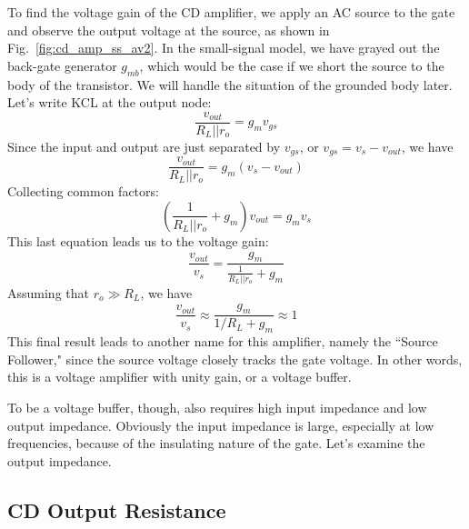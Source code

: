 To find the voltage gain of the CD amplifier, we apply an AC source to the gate and observe the output voltage at the source, as shown in Fig.~\ref{fig:cd_amp_ss_av2}.  In the small-signal model, we have grayed out the back-gate generator $g_{mb}$, which would be the case if we short the source to the body of the transistor.  We will handle the situation of the grounded body later. Let's write KCL at the output node:
% 
\begin{equation}
	\frac{{{v_{out}}}}{{{R_L}||{r_o}}} = {g_m}{v_{gs}}
\end{equation}
%
Since the input and output are just separated by $v_{gs}$, or $v_{gs} = v_{s} - v_{out}$, we have
%
\begin{equation}
	\frac{{{v_{out}}}}{{{R_L}||{r_o}}} = {g_m}\left( {{v_{s}} - {v_{out}}} \right)
\end{equation}
%
Collecting common factors:
%
\begin{equation}
	\left( {\frac{1}{{{R_L}||{r_o}}} + {g_m}} \right){v_{out}} = {g_m}{v_{s}}
\end{equation}
%
This last equation leads us to the voltage gain:
%
\begin{equation}
	\frac{{{v_{out}}}}{{{v_{s}}}} = \frac{{{g_m}}}{{\frac{1}{{{R_L}||{r_o}}} + {g_m}}}
\end{equation}
Assuming that $r_o \gg R_L$, we have
%
\begin{equation}
	\frac{{{v_{out}}}}{{{v_{s}}}} \approx \frac{{{g_m}}}{{1/{R_L} + {g_m}}} \approx 1
\end{equation}
%
This final result leads to another name for this amplifier, namely the ``Source Follower," since the source voltage closely tracks the gate voltage.  In other words, this is a voltage amplifier with unity gain, or a voltage buffer.

To be a voltage buffer, though, also requires high input impedance and low output impedance.  Obviously the input impedance is large, especially at low frequencies, because of the insulating nature of the gate.  Let's examine the output impedance.




\subsection{CD Output Resistance}


